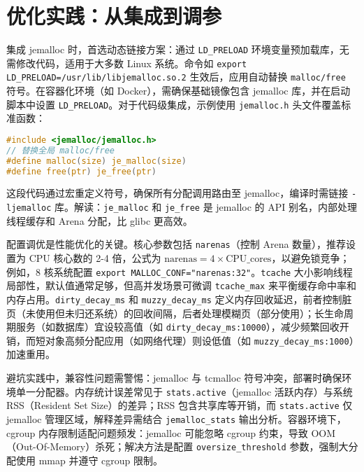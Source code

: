 \chapter{优化实践：从集成到调参}
集成 jemalloc 时，首选动态链接方案：通过 \texttt{LD\_{}PRELOAD} 环境变量预加载库，无需修改代码，适用于大多数 Linux 系统。命令如 \texttt{export LD\_{}PRELOAD=/usr/lib/libjemalloc.so.2} 生效后，应用自动替换 \texttt{malloc/free} 符号。在容器化环境（如 Docker），需确保基础镜像包含 jemalloc 库，并在启动脚本中设置 \texttt{LD\_{}PRELOAD}。对于代码级集成，示例使用 \texttt{jemalloc.h} 头文件覆盖标准函数：\par
\begin{lstlisting}[language=c]
#include <jemalloc/jemalloc.h>
// 替换全局 malloc/free
#define malloc(size) je_malloc(size)
#define free(ptr) je_free(ptr)
\end{lstlisting}
这段代码通过宏重定义符号，确保所有分配调用路由至 jemalloc，编译时需链接 \texttt{-ljemalloc} 库。解读：\texttt{je\_{}malloc} 和 \texttt{je\_{}free} 是 jemalloc 的 API 别名，内部处理线程缓存和 Arena 分配，比 glibc 更高效。\par
配置调优是性能优化的关键。核心参数包括 \texttt{narenas}（控制 Arena 数量），推荐设置为 CPU 核心数的 2-4 倍，公式为 $\text{narenas} = 4 \times \text{CPU\_cores}$，以避免锁竞争；例如，8 核系统配置 \texttt{export MALLOC\_{}CONF="narenas:32"}。\texttt{tcache} 大小影响线程局部性，默认值通常足够，但高并发场景可微调 \texttt{tcache\_{}max} 来平衡缓存命中率和内存占用。\texttt{dirty\_{}decay\_{}ms} 和 \texttt{muzzy\_{}decay\_{}ms} 定义内存回收延迟，前者控制脏页（未使用但未归还系统）的回收间隔，后者处理模糊页（部分使用）；长生命周期服务（如数据库）宜设较高值（如 \texttt{dirty\_{}decay\_{}ms:10000}），减少频繁回收开销，而短对象高频分配应用（如网络代理）则设低值（如 \texttt{muzzy\_{}decay\_{}ms:1000}）加速重用。\par
避坑实践中，兼容性问题需警惕：jemalloc 与 tcmalloc 符号冲突，部署时确保环境单一分配器。内存统计误差常见于 \texttt{stats.active}（jemalloc 活跃内存）与系统 RSS（Resident Set Size）的差异；RSS 包含共享库等开销，而 \texttt{stats.active} 仅 jemalloc 管理区域，解释差异需结合 \texttt{jemalloc\_{}stats} 输出分析。容器环境下，cgroup 内存限制适配问题频发：jemalloc 可能忽略 cgroup 约束，导致 OOM（Out-Of-Memory）杀死；解决方法是配置 \texttt{oversize\_{}threshold} 参数，强制大分配使用 mmap 并遵守 cgroup 限制。\par
